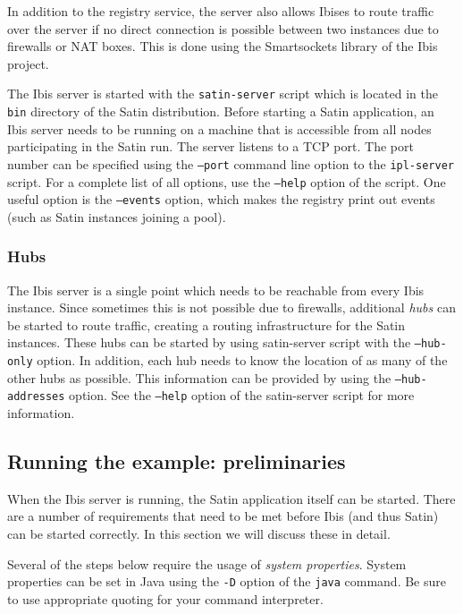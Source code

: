 \documentclass[a4paper,10pt]{article}
\begin{document}
In addition to the registry service, the server also allows
Ibises to route traffic over the server if no direct connection is
possible between two instances due to firewalls or NAT boxes. This is
done using the Smartsockets library of the Ibis project.

The Ibis server is started with the \texttt{satin-server} script which is
located in the \texttt{bin} directory of the Satin distribution.  Before
starting a Satin application, an Ibis server needs to be running on a
machine that is accessible from all nodes participating in the Satin run.
The server listens to a TCP port. The port number can be specified using
the \texttt{--port} command line option to the \texttt{ipl-server}
script.  For a complete list of all options, use the \texttt{--help}
option of the script. One useful option is the  \texttt{--events}
option, which makes the registry print out events (such as Satin instances
joining a pool).

\subsubsection{Hubs}
\label{hubs}

The Ibis server is a single point which needs to be reachable from every
Ibis instance. Since sometimes this is not possible due to firewalls,
additional \emph{hubs} can be started to route traffic, creating a
routing infrastructure for the Satin instances. These hubs can be started
by using satin-server script with the \texttt{--hub-only} option. In
addition, each hub needs to know the location of as many of the other
hubs as possible. This information can be provided by using the
\texttt{--hub-addresses} option. See the \texttt{--help} option of the
satin-server script for more information.

\subsection{Running the example: preliminaries}

When the Ibis server is running, the Satin application itself can be
started.  There are a number of requirements that need to be met before
Ibis (and thus Satin) can be started correctly.
In this section we will discuss these in detail.

Several of the steps below require the usage of \emph{system properties}.
System properties can be set in Java using the \texttt{-D} option of the
\texttt{java} command. Be sure to use appropriate quoting for your
command interpreter.
\end{document}
